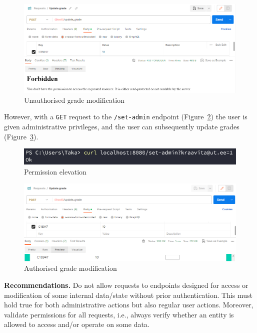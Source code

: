 \documentclass[parskip=half]{scrartcl}
\newcommand{\figref}[1]{Figure~\ref{#1}}
\begin{document}
\begin{figure}[h]
    \centering
    \includegraphics[width=\textwidth]{forbidden_grade}
    \caption{Unauthorised grade modification}
    \label{fig:grades:failupdate}
\end{figure}

However, with a \texttt{GET} request to the \texttt{/set-admin} endpoint
(\figref{fig:setadmin}) the user is given administrative privileges, and the
user can subsequently update grades (\figref{fig:grades:update}).

\begin{figure}[h]
    \centering
    \includegraphics[width=\textwidth]{set_admin}
    \caption{Permission elevation}
    \label{fig:setadmin}
\end{figure}

\begin{figure}[h]
    \centering
    \includegraphics[width=\textwidth]{view_new_grade}
    \caption{Authorised grade modification}
    \label{fig:grades:update}
\end{figure}

\textbf{Recommendations.} Do not allow requests to endpoints designed for
access or modification of some internal data/state without prior
authentication. This must hold true for both administrative actions but also
regular user actions. Moreover, validate permissions for all requests, i.e.,
always verify whether an entity is allowed to access and/or operate on some
data.
\end{document}

